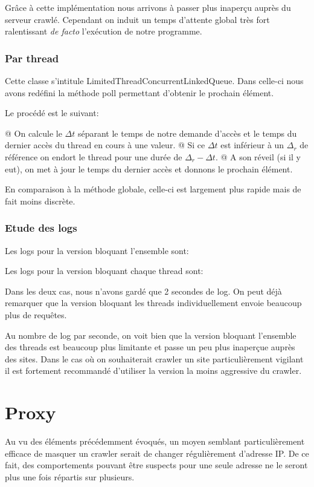 \documentclass[hideweeklyreports,noposter]{polytech/polytech}
\begin{document}
				Grâce à cette implémentation nous arrivons à passer plus inaperçu auprès du serveur crawlé.
				Cependant on induit un temps d'attente global très fort ralentissant \textit{de facto} l'exécution de notre programme.
			
			\subsection{Par thread}
				Cette classe s'intitule  LimitedThreadConcurrentLinkedQueue.
				Dans celle-ci nous avons redéfini la méthode poll permettant d'obtenir le prochain élément.
				
				Le procédé est le suivant:
				\begin{easylist}[itemize]
					@ On calcule le $\Delta t$ séparant le temps de notre demande d'accès et le temps du dernier accès du thread en cours à une valeur.
					@ Si ce $\Delta t$ est inférieur à un $\Delta_r$ de référence on endort le thread pour une durée de $\Delta_r - \Delta t$.
					@ A son réveil (si il y eut), on met à jour le temps du dernier accès et donnons le prochain élément.
				\end{easylist}

				En comparaison à la méthode globale, celle-ci est largement plus rapide mais de fait moins discrète.
				
			\subsection{Etude des logs}
				Les logs pour la version bloquant l'ensemble sont:
				
				Les logs pour la version bloquant chaque thread sont:
				
				Dans les deux cas, nous n'avons gardé que 2 secondes de log.
				On peut déjà remarquer que la version bloquant les threads individuellement envoie beaucoup plus de requêtes.
				
				Au nombre de log par seconde, on voit bien que la version bloquant l'ensemble des threads est beaucoup plus limitante et passe un peu plus inaperçue auprès des sites.
				Dans le cas où on souhaiterait crawler un site particulièrement vigilant il est fortement recommandé d'utiliser la version la moins aggressive du crawler.
	
	\chapter{Proxy}
	    Au vu des éléments précédemment évoqués, un moyen semblant particulièrement efficace de masquer un crawler serait de changer régulièrement d'adresse IP.
	    De ce fait, des comportements pouvant être suspects pour une seule adresse ne le seront plus une fois répartis sur plusieurs.
	    
\end{document}
